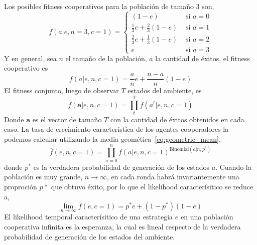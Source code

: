 \documentclass[a4paper,10pt]{article}
\begin{document}

Los posibles fitness cooperativos para la población de tamaño 3 son,
%
\begin{equation}
f(a|e,n=3,c=1) =
\begin{cases}
(1-e) & \text{ si } a = 0 \\
\frac{1}{3} e + \frac{2}{3} (1-e)  & \text{ si } a = 1 \\
\frac{2}{3} e + \frac{1}{3} (1-e)    & \text{ si } a = 2 \\
e & \text{ si } a = 3
\end{cases}
\end{equation}
%
Y en general, sea $n$ el tamaño de la población, $a$ la cantidad de éxitos, el fitness cooperativo es
\begin{equation}\label{eq:fitness_cooperador}
f(a|e,n,c=1) = \frac{a}{n} e + \frac{n-a}{n}(1-e)
\end{equation}
%
El fitness conjunto, luego de observar $T$ estados del ambiente, es
%
\begin{equation}
f(\bm{a}|e,n,c=1) = \prod^T_t f(a^t|e,n,c=1)
\end{equation}
%
Donde $\bm{a}$ es el vector de tamaño $T$ con la cantidad de éxitos obtenidos en cada caso.
La tasa de crecimiento característica de los agentes cooperadores la podemos calcular utilizando la media geomética~\ref{eq:geometric_mean},
%
\begin{equation}
\overline{f}(e,n,c=1) = \prod_{a=0}^n f(a|e,n,c=1)^{\text{Binomial}(a|n,p^*)}
\end{equation}
%
donde $p^*$ es la verdadera probabilidad de generación de los estados $a$.
Cuando la población es muy grande, $n\rightarrow \infty$, en cada ronda habrá invariantemente una proproción $p*$ que obtuvo éxito, por lo que el likelihood caracterísitico se reduce a,
%
\begin{equation}
\lim_{n\rightarrow \infty} \overline{f}(e,c=1) = p^* e + (1-p^*)(1-e)
\end{equation}
%
El likelihood temporal caracterísitico de una estrategia $e$ en una población cooperativa infinita es la esperanza, la cual es lineal respecto de la verdadera probabilidad de generación de los estados del ambiente.

\end{document}
